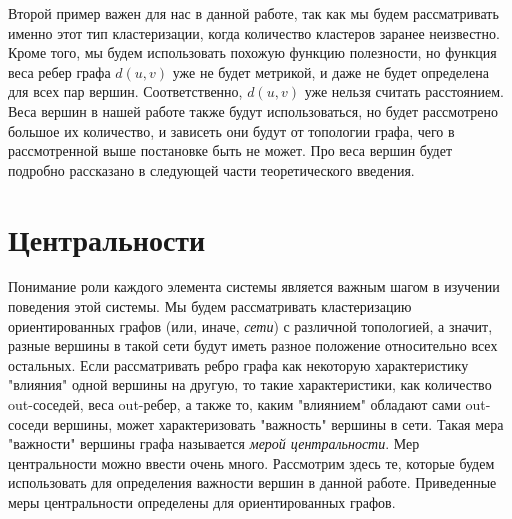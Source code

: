 Второй пример важен для нас в данной работе, так как мы будем рассматривать именно этот тип кластеризации, когда количество кластеров заранее неизвестно. Кроме того, мы будем использовать похожую функцию полезности, но функция веса ребер графа $d(u, v)$ уже не будет метрикой, и даже не будет определена для всех пар вершин. Соответственно, $d(u, v)$ уже нельзя считать расстоянием. Веса вершин в нашей работе также будут использоваться, но будет рассмотрено большое их количество, и зависеть они будут от топологии графа, чего в рассмотренной выше постановке быть не может. Про веса вершин будет подробно рассказано в следующей части теоретического введения. 

\section{Центральности}

Понимание роли каждого элемента системы является важным шагом в изучении поведения этой системы. Мы будем рассматривать кластеризацию ориентированных графов (или, иначе, \textit{сети}) с различной топологией, а значит, разные вершины в такой сети будут иметь разное положение относительно всех остальных. Если рассматривать ребро графа как некоторую характеристику "влияния" одной вершины на другую, то такие характеристики, как количество out-соседей, веса out-ребер, а также то, каким "влиянием" обладают сами out-соседи вершины, может характеризовать "важность" вершины в сети. Такая мера "важности" вершины графа называется \textit{мерой центральности}. Мер центральности можно ввести очень много. Рассмотрим здесь те, которые будем использовать для определения важности вершин в данной работе. Приведенные меры центральности определены для ориентированных графов.

